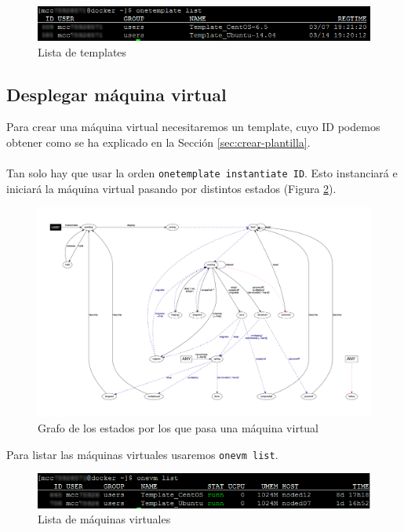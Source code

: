 \begin{figure}[H]
	\centering
	\includegraphics[width=14cm]{img/onetemplate-list}
	\caption{Lista de templates}
	\label{fig:onetemplate-list}
\end{figure}

\subsection{Desplegar máquina virtual}

Para crear una máquina virtual necesitaremos un template, cuyo ID podemos obtener como se ha explicado en la Sección \ref{sec:crear-plantilla}.
\\ \\
Tan solo hay que usar la orden \texttt{onetemplate instantiate ID}. Esto instanciará e iniciará la máquina virtual pasando por distintos estados (Figura \ref{fig:grafo-estados}).

\begin{figure}[H]
	\centering
	\includegraphics[width=14.5cm]{img/grafo-estados}
	\caption{Grafo de los estados por los que pasa una máquina virtual}
	\label{fig:grafo-estados}
\end{figure}

Para listar las máquinas virtuales usaremos \texttt{onevm list}.

\begin{figure}[H]
	\centering
	\includegraphics[width=14cm]{img/onevm-list}
	\caption{Lista de máquinas virtuales}
	\label{fig:onevm-list}
\end{figure}

